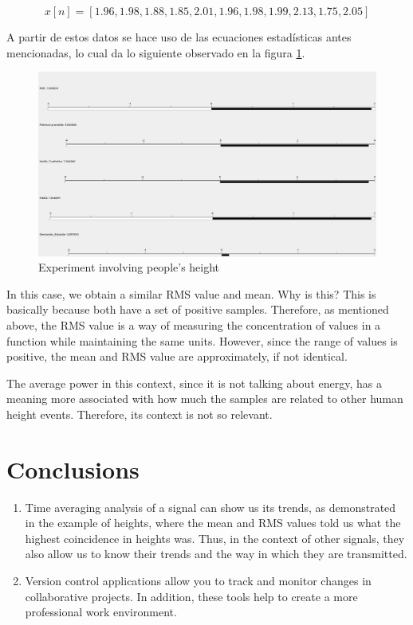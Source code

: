 \documentclass{journal}[IEEEtran, twocolumn]             %
\begin{document}
\begin{multicols}{2}
\begin{equation*}
    x[n] = [1.96,1.98,1.88,1.85,2.01,1.96,1.98,1.99,2.13,1.75,2.05]
\end{equation*}

A partir de estos datos se hace uso de las ecuaciones estadísticas antes mencionadas, lo cual da lo siguiente observado en la figura \ref{fig:fig_6}.

\begin{figure}[H]
        \centering
        \begin{adjustbox}{frame=1pt 1pt,center=1pt}
            \includegraphics[width=0.8\columnwidth]{figs/T_A_results.png}
        \end{adjustbox}
        \caption{\centering Experiment involving people's height}
        \label{fig:fig_6}
\end{figure}

In this case, we obtain a similar RMS value and mean. Why is this? This is basically because both have a set of positive samples. Therefore, as mentioned above, the RMS value is a way of measuring the concentration of values in a function while maintaining the same units. However, since the range of values is positive, the mean and RMS value are approximately, if not identical.

The average power in this context, since it is not talking about energy, has a meaning more associated with how much the samples are related to other human height events. Therefore, its context is not so relevant.

\section{Conclusions}

\begin{enumerate}
    \item Time averaging analysis of a signal can show us its trends, as demonstrated in the example of heights, where the mean and RMS values told us what the highest coincidence in heights was. Thus, in the context of other signals, they also allow us to know their trends and the way in which they are transmitted.
    \item Version control applications allow you to track and monitor changes in collaborative projects. In addition, these tools help to create a more professional work environment.
\end{enumerate}


\end{multicols}
\end{document}
